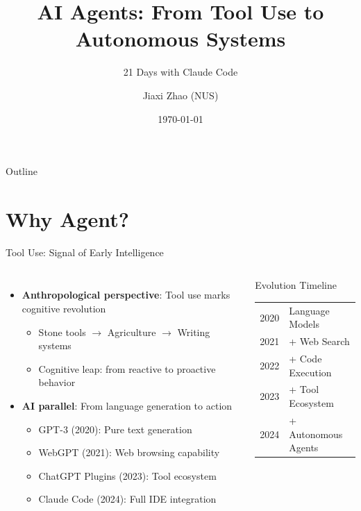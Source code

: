 \documentclass[aspectratio=169]{beamer}
\title[AI Agents]{AI Agents: From Tool Use to Autonomous Systems}
\subtitle{21 Days with Claude Code}
\author[J. Zhao]{Jiaxi Zhao (NUS)}
\date[\today]{\today}
\begin{document}
\begin{frame}
\titlepage
\end{frame}

\begin{frame}{Outline}
\tableofcontents
\end{frame}

\section{Why Agent?}

\begin{frame}{Tool Use: Signal of Early Intelligence}
	\begin{columns}
		\begin{itemize}
			\item {\color{highlight}\textbf{Anthropological perspective}}: Tool use marks cognitive revolution
			\begin{itemize}
				\item Stone tools $\rightarrow$ Agriculture $\rightarrow$ Writing systems
				\item Cognitive leap: from reactive to proactive behavior
			\end{itemize}
			\item {\color{highlight}\textbf{AI parallel}}: From language generation to action
			\begin{itemize}
				\item GPT-3 (2020): Pure text generation
				\item WebGPT (2021): Web browsing capability
				\item ChatGPT Plugins (2023): Tool ecosystem
				\item Claude Code (2024): Full IDE integration
			\end{itemize}
		\end{itemize}
		\begin{block}{Evolution Timeline}
			\small
			\begin{tabular}{ll}
				2020 & Language Models \\
				2021 & + Web Search \\
				2022 & + Code Execution \\
				2023 & + Tool Ecosystem \\
				2024 & + Autonomous Agents \\
			\end{tabular}
		\end{block}
	\end{columns}
\end{frame}
\end{document}

